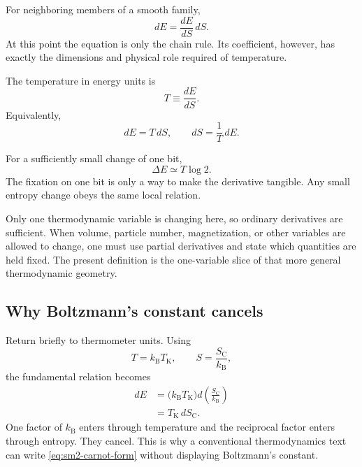 For neighboring members of a smooth family,
\begin{equation}
 dE=\frac{dE}{dS}\,dS.
 \label{eq:sm2-differential-identity}
\end{equation}
At this point the equation is only the chain rule. Its coefficient, however,
has exactly the dimensions and physical role required of temperature.

\begin{definition}
The temperature in energy units is
\begin{equation}
 T\equiv\frac{dE}{dS}.
 \label{eq:sm2-temperature-definition}
\end{equation}
Equivalently,
\begin{equation}
 dE=T\,dS,
 \qquad
 dS=\frac{1}{T}\,dE.
 \label{eq:sm2-fundamental-differentials}
\end{equation}
\end{definition}

For a sufficiently small change of one bit,
\begin{equation}
 \Delta E\simeq T\log2.
 \label{eq:sm2-one-bit-energy}
\end{equation}
The fixation on one bit is only a way to make the derivative tangible. Any
small entropy change obeys the same local relation.

\begin{classroomqa}
\end{classroomqa}

Only one thermodynamic variable is changing here, so ordinary derivatives are
sufficient. When volume, particle number, magnetization, or other variables
are allowed to change, one must use partial derivatives and state which
quantities are held fixed. The present definition is the one-variable slice
of that more general thermodynamic geometry.

\subsection{Why Boltzmann's constant cancels}

Return briefly to thermometer units. Using
\[
 T=k_{\mathrm B}T_{\mathrm K},
 \qquad
 S=\frac{S_{\mathrm C}}{k_{\mathrm B}},
\]
the fundamental relation becomes
\begin{align}
 dE
 &=\bigl(k_{\mathrm B}T_{\mathrm K}\bigr)
   d\left(\frac{S_{\mathrm C}}{k_{\mathrm B}}\right)\\
 &=T_{\mathrm K}\,dS_{\mathrm C}.
 \label{eq:sm2-carnot-form}
\end{align}
One factor of \(k_{\mathrm B}\) enters through temperature and the reciprocal
factor enters through entropy. They cancel. This is why a conventional
thermodynamics text can write \eqref{eq:sm2-carnot-form} without displaying
Boltzmann's constant.

